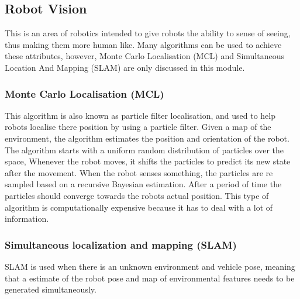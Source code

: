 \subsection{Robot Vision}
This is an area of robotics intended to give robots the ability to sense of seeing, thus making them more human like. Many algorithms can be used to achieve these attributes, however, Monte Carlo Localisation (MCL) and Simultaneous Location And Mapping (SLAM) are only discussed in this module.
\subsubsection{Monte Carlo Localisation (MCL)}
This algorithm is also known as particle filter localisation, and used to help robots localise there position by using a particle filter. Given a map of the environment, the algorithm estimates the position and orientation of the robot.  The algorithm starts with a uniform random distribution of particles over the space, Whenever the robot moves, it shifts the particles to predict its new state after the movement. When the robot senses something, the particles are re sampled based on a recursive Bayesian estimation. After a period of time the particles should converge towards the robots actual position. This type of algorithm is computationally expensive because it has to deal with a lot of information.
\subsubsection{Simultaneous localization and mapping (SLAM)}
SLAM is used when there is an unknown environment and vehicle pose, meaning that a estimate of the robot pose and map of environmental features needs to be generated simultaneously. 